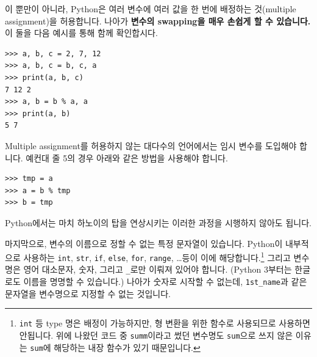 \documentclass[../main.tex]{subfiles}
\begin{document}
이 뿐만이 아니라, Python은 여러 변수에 여러 값을 한 번에 배정하는 것(multiple assignment)을 허용합니다.
나아가 \textbf{변수의 swapping을 매우 손쉽게 할 수 있습니다.}
이 둘을 다음 예시를 통해 함께 확인합시다.
\begin{verbatim}
>>> a, b, c = 2, 7, 12
>>> a, b, c = b, c, a
>>> print(a, b, c)
7 12 2
>>> a, b = b % a, a
>>> print(a, b)
5 7
\end{verbatim}
Multiple assignment를 허용하지 않는 대다수의 언어에서는 임시 변수를 도입해야 합니다.
예컨대 줄 5의 경우 아래와 같은 방법을 사용해야 합니다.
\begin{verbatim}
>>> tmp = a
>>> a = b % tmp
>>> b = tmp
\end{verbatim}
Python에서는 마치 하노이의 탑을 연상시키는 이러한 과정을 시행하지 않아도 됩니다.

마지막으로, 변수의 이름으로 정할 수 없는 특정 문자열이 있습니다.
Python이 내부적으로 사용하는 \texttt{int}, \texttt{str}, \texttt{if}, \texttt{else}, \texttt{for}, \texttt{range}, \dots 등이 이에 해당합니다.\footnote{\texttt{int} 등 type 명은 배정이 가능하지만, 형 변환을 위한 함수로 사용되므로 사용하면 안됩니다. 위에 나왔던 코드 중 \texttt{summ}이라고 썼던 변수명도 \texttt{sum}으로 쓰지 않은 이유는 \texttt{sum}에 해당하는 내장 함수가 있기 때문입니다.}
그리고 변수명은 영어 대소문자, 숫자, 그리고 \texttt{\_}로만 이뤄져 있어야 합니다.
(Python 3부터는 한글로도 이름을 명명할 수 있습니다.)
나아가 숫자로 시작할 수 없는데, \texttt{1st\_name}과 같은 문자열을 변수명으로 지정할 수 없는 것입니다.
\end{document}
